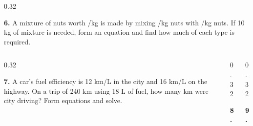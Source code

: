 \documentclass[aspectratio=169,12pt]{beamer}
\newcommand{\MMProblem}[2]{\begin{MMProblemCard}\raggedright\small\textbf{#1.} #2\par\end{MMProblemCard}}
\begin{document}
\begin{frame}[t]
\begin{columns}[T,onlytextwidth]
\begin{column}{0.32\textwidth}\MMProblem{6}{A mixture of nuts worth /kg is made by mixing \textdollar 4/kg nuts with \textdollar 8/kg nuts. If 10 kg of mixture is needed, form an equation and find how much of each type is required.}\end{column}
\end{columns}
\vspace{0.45em}
\begin{columns}[T,onlytextwidth]
\begin{column}{0.32\textwidth}\MMProblem{7}{A car's fuel efficiency is 12 km/L in the city and 16 km/L on the highway. On a trip of 240 km using 18 L of fuel, how many km were city driving? Form equations and solve.}\end{column}
\begin{column}{0.32\textwidth}\MMProblem{8}{}\end{column}
\begin{column}{0.32\textwidth}\MMProblem{9}{}\end{column}
\end{columns}
\end{frame}
\end{document}
